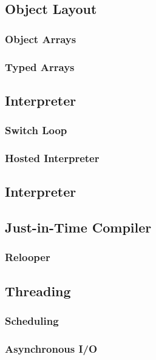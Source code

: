 \documentclass{acm_proc_article-sp}
\begin{document}
\subsection{Object Layout} \label{sec:objectLayout}

\subsubsection{Object Arrays}

\subsubsection{Typed Arrays}

\subsection{Interpreter}

\subsubsection{Switch Loop}

\subsubsection{Hosted Interpreter}

\subsection{Interpreter}

\subsection{Just-in-Time Compiler}

\subsubsection{Relooper}

\subsection{Threading}

\subsubsection{Scheduling}

\subsubsection{Asynchronous I/O}
\end{document}
